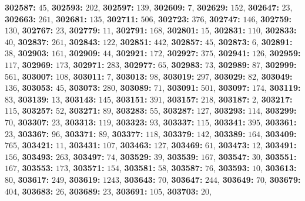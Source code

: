 \textsf{\bfseries 302587:} $45$, \textsf{\bfseries 302593:} $202$, \textsf{\bfseries 302597:} $139$, \textsf{\bfseries 302609:} $7$, \textsf{\bfseries 302629:} $152$, \textsf{\bfseries 302647:} $23$, \textsf{\bfseries 302663:} $261$, \textsf{\bfseries 302681:} $135$, \textsf{\bfseries 302711:} $506$, \textsf{\bfseries 302723:} $376$, \textsf{\bfseries 302747:} $146$, \textsf{\bfseries 302759:} $130$, \textsf{\bfseries 302767:} $23$, \textsf{\bfseries 302779:} $11$, \textsf{\bfseries 302791:} $168$, \textsf{\bfseries 302801:} $15$, \textsf{\bfseries 302831:} $110$, \textsf{\bfseries 302833:} $40$, \textsf{\bfseries 302837:} $261$, \textsf{\bfseries 302843:} $122$, \textsf{\bfseries 302851:} $442$, \textsf{\bfseries 302857:} $45$, \textsf{\bfseries 302873:} $6$, \textsf{\bfseries 302891:} $38$, \textsf{\bfseries 302903:} $161$, \textsf{\bfseries 302909:} $44$, \textsf{\bfseries 302921:} $172$, \textsf{\bfseries 302927:} $375$, \textsf{\bfseries 302941:} $126$, \textsf{\bfseries 302959:} $117$, \textsf{\bfseries 302969:} $173$, \textsf{\bfseries 302971:} $283$, \textsf{\bfseries 302977:} $65$, \textsf{\bfseries 302983:} $73$, \textsf{\bfseries 302989:} $87$, \textsf{\bfseries 302999:} $561$, \textsf{\bfseries 303007:} $108$, \textsf{\bfseries 303011:} $7$, \textsf{\bfseries 303013:} $98$, \textsf{\bfseries 303019:} $297$, \textsf{\bfseries 303029:} $82$, \textsf{\bfseries 303049:} $136$, \textsf{\bfseries 303053:} $45$, \textsf{\bfseries 303073:} $280$, \textsf{\bfseries 303089:} $71$, \textsf{\bfseries 303091:} $501$, \textsf{\bfseries 303097:} $174$, \textsf{\bfseries 303119:} $83$, \textsf{\bfseries 303139:} $13$, \textsf{\bfseries 303143:} $145$, \textsf{\bfseries 303151:} $391$, \textsf{\bfseries 303157:} $218$, \textsf{\bfseries 303187:} $2$, \textsf{\bfseries 303217:} $115$, \textsf{\bfseries 303257:} $52$, \textsf{\bfseries 303271:} $89$, \textsf{\bfseries 303283:} $55$, \textsf{\bfseries 303287:} $127$, \textsf{\bfseries 303293:} $114$, \textsf{\bfseries 303299:} $70$, \textsf{\bfseries 303307:} $23$, \textsf{\bfseries 303313:} $119$, \textsf{\bfseries 303323:} $93$, \textsf{\bfseries 303337:} $115$, \textsf{\bfseries 303341:} $395$, \textsf{\bfseries 303361:} $23$, \textsf{\bfseries 303367:} $96$, \textsf{\bfseries 303371:} $89$, \textsf{\bfseries 303377:} $118$, \textsf{\bfseries 303379:} $142$, \textsf{\bfseries 303389:} $164$, \textsf{\bfseries 303409:} $765$, \textsf{\bfseries 303421:} $11$, \textsf{\bfseries 303431:} $107$, \textsf{\bfseries 303463:} $127$, \textsf{\bfseries 303469:} $61$, \textsf{\bfseries 303473:} $12$, \textsf{\bfseries 303491:} $156$, \textsf{\bfseries 303493:} $263$, \textsf{\bfseries 303497:} $74$, \textsf{\bfseries 303529:} $39$, \textsf{\bfseries 303539:} $167$, \textsf{\bfseries 303547:} $30$, \textsf{\bfseries 303551:} $167$, \textsf{\bfseries 303553:} $173$, \textsf{\bfseries 303571:} $154$, \textsf{\bfseries 303581:} $58$, \textsf{\bfseries 303587:} $76$, \textsf{\bfseries 303593:} $10$, \textsf{\bfseries 303613:} $80$, \textsf{\bfseries 303617:} $249$, \textsf{\bfseries 303619:} $1243$, \textsf{\bfseries 303643:} $70$, \textsf{\bfseries 303647:} $244$, \textsf{\bfseries 303649:} $70$, \textsf{\bfseries 303679:} $404$, \textsf{\bfseries 303683:} $26$, \textsf{\bfseries 303689:} $23$, \textsf{\bfseries 303691:} $105$, \textsf{\bfseries 303703:} $20$, 
